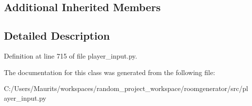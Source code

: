 \subsection*{Additional Inherited Members}


\subsection{Detailed Description}


Definition at line 715 of file player\+\_\+input.\+py.



The documentation for this class was generated from the following file\+:\begin{DoxyCompactItemize}
\item 
C\+:/\+Users/\+Maurits/workspaces/random\+\_\+project\+\_\+workspace/roomgenerator/src/player\+\_\+input.\+py\end{DoxyCompactItemize}
